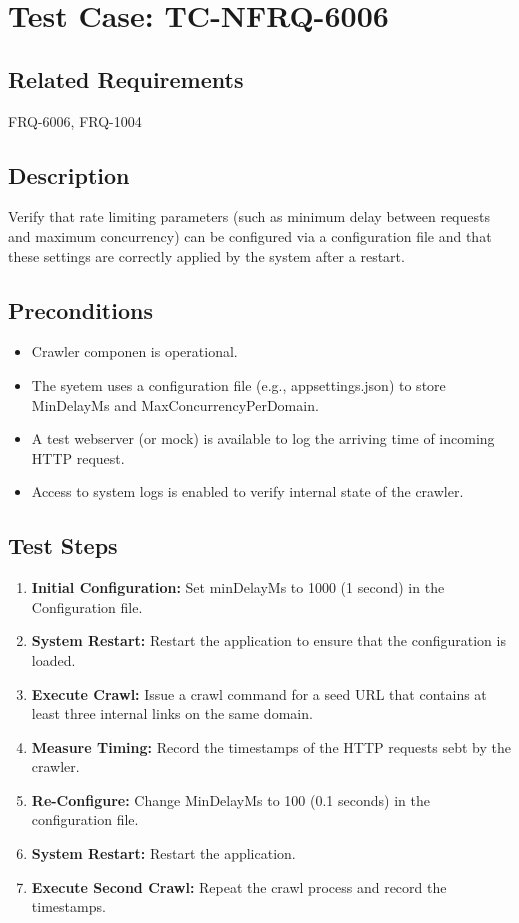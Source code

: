\documentclass{article}
\begin{document}


\section{Test Case: TC-NFRQ-6006}

\subsection*{Related Requirements}
FRQ-6006, FRQ-1004

\subsection*{Description}
Verify that rate limiting parameters (such as minimum delay between requests and maximum concurrency) 
can be configured via a configuration file and that these settings are correctly applied by 
the system after a restart.

\subsection*{Preconditions}
\begin{itemize}
    \item Crawler componen is operational.
    \item The syetem uses a configuration file (e.g., appsettings.json) to store MinDelayMs and 
    MaxConcurrencyPerDomain.
    \item A test webserver (or mock) is available to log the arriving time of incoming HTTP request.
    \item Access to system logs is enabled to verify internal state of the crawler.
\end{itemize}

\subsection*{Test Steps}
\begin{enumerate}
    \item \textbf{Initial Configuration:} Set minDelayMs to 1000 (1 second) in the Configuration file.
    \item \textbf{System Restart:} Restart the application to ensure that the configuration is loaded.
    \item \textbf{Execute Crawl:} Issue a crawl command for a seed URL that contains at least three internal links on the same domain.
    \item \textbf{Measure Timing:} Record the timestamps of the HTTP requests sebt by the crawler.
    \item \textbf{Re-Configure:} Change MinDelayMs to 100 (0.1 seconds) in the configuration file.
    \item \textbf{System Restart:} Restart the application.
    \item \textbf{Execute Second Crawl:} Repeat the crawl process and record the timestamps.
\end{enumerate}
\end{document}
